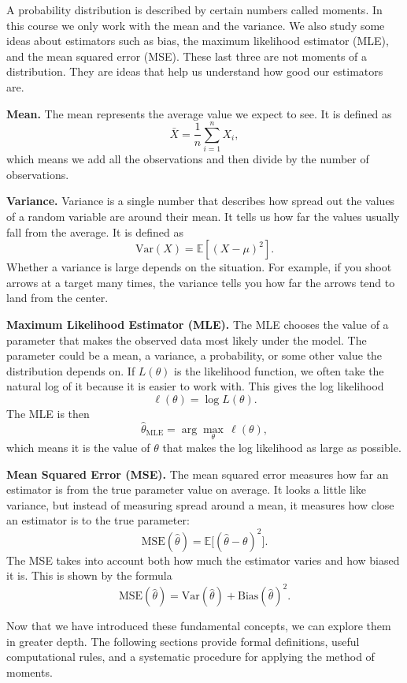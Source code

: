 \documentclass[11pt,letterpaper]{article}
\theoremstyle{remark}
\begin{document}
A probability distribution is described by certain numbers called moments. In this course we only work with the mean and the variance. We also study some ideas about estimators such as bias, the maximum likelihood estimator (MLE), and the mean squared error (MSE). These last three are not moments of a distribution. They are ideas that help us understand how good our estimators are.

\textbf{Mean.}
The mean represents the average value we expect to see. It is defined as
\[
\bar{X} = \frac{1}{n}\sum_{i=1}^{n} X_i,
\]
which means we add all the observations and then divide by the number of observations.

\textbf{Variance.}
Variance is a single number that describes how spread out the values of a random variable are around their mean. It tells us how far the values usually fall from the average. It is defined as
\[
\mathrm{Var}(X) = \mathbb{E}[(X - \mu)^2].
\]
Whether a variance is large depends on the situation. For example, if you shoot arrows at a target many times, the variance tells you how far the arrows tend to land from the center.

\textbf{Maximum Likelihood Estimator (MLE).}
The MLE chooses the value of a parameter that makes the observed data most likely under the model. The parameter could be a mean, a variance, a probability, or some other value the distribution depends on. If $L(\theta)$ is the likelihood function, we often take the natural log of it because it is easier to work with. This gives the log likelihood
\[
\ell(\theta) = \log L(\theta).
\]
The MLE is then
\[
\hat{\theta}_{\mathrm{MLE}} = \arg\max_{\theta} \, \ell(\theta),
\]
which means it is the value of $\theta$ that makes the log likelihood as large as possible.

\textbf{Mean Squared Error (MSE).}
The mean squared error measures how far an estimator is from the true parameter value on average. It looks a little like variance, but instead of measuring spread around a mean, it measures how close an estimator is to the true parameter:
\[
\mathrm{MSE}(\hat{\theta}) = \mathbb{E}\big[(\hat{\theta} - \theta)^2\big].
\]
The MSE takes into account both how much the estimator varies and how biased it is. This is shown by the formula
\[
\mathrm{MSE}(\hat{\theta}) = \mathrm{Var}(\hat{\theta}) + \mathrm{Bias}(\hat{\theta})^2.
\]

Now that we have introduced these fundamental concepts, we can explore them in greater depth. The following sections provide formal definitions, useful computational rules, and a systematic procedure for applying the method of moments.
\end{document}
